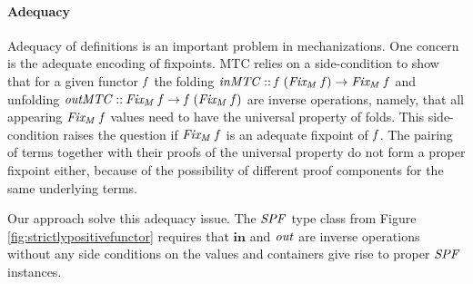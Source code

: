 \paragraph{Adequacy}

Adequacy of definitions is an important problem in mechanizations. One
concern is the adequate encoding of fixpoints. MTC relies on a
side-condition to show that for a given functor \ensuremath{\Varid{f}} the folding \ensuremath{\Varid{inMTC}\mathbin{::}\Varid{f}\;(\Varid{Fix_{M}}\;\Varid{f})\to \Varid{Fix_{M}}\;\Varid{f}} and unfolding \ensuremath{\Varid{outMTC}\mathbin{::}\Varid{Fix_{M}}\;\Varid{f}\to \Varid{f}\;(\Varid{Fix_{M}}\;\Varid{f})} are inverse operations, namely, that all appearing \ensuremath{\Varid{Fix_{M}}\;\Varid{f}} values need to have the universal property of folds. This
side-condition raises the question if \ensuremath{\Varid{Fix_{M}}\;\Varid{f}} is an adequate
fixpoint of \ensuremath{\Varid{f}}. The pairing of terms together with their proofs of
the universal property do not form a proper fixpoint either, because
of the possibility of different proof components for the same
underlying terms.

Our approach solve this adequacy issue. The \ensuremath{\Conid{SPF}} type class from
Figure \ref{fig:strictlypositivefunctor} requires that \ensuremath{\mathbf{in}} and \ensuremath{\Varid{out}}
are inverse operations without any side conditions on the values and
containers give rise to proper \ensuremath{\Conid{SPF}} instances.



